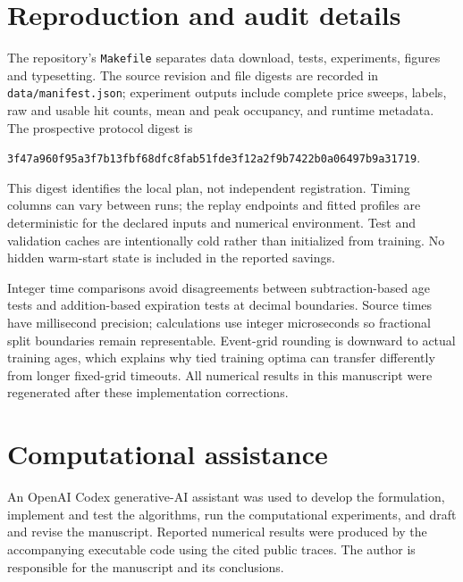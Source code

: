 \documentclass[11pt,a4paper]{article}
\begin{document}
\clearpage
\section{Reproduction and audit details}
The repository's \texttt{Makefile} separates data download, tests, experiments,
figures and typesetting. The source revision and file digests are recorded in
\texttt{data/manifest.json}; experiment outputs include complete price sweeps,
labels, raw and usable hit counts, mean and peak occupancy, and runtime metadata.
The prospective protocol digest is
\begin{center}\footnotesize\texttt{3f47a960f95a3f7b13fbf68dfc8fab51fde3f12a2f9b7422b0a06497b9a31719}.\end{center}
This digest identifies the local plan, not independent registration. Timing
columns can vary between runs; the replay endpoints and fitted profiles are
deterministic for the declared inputs and numerical environment. Test and
validation caches are intentionally cold rather than initialized from training.
No hidden warm-start state is included in the reported savings.

Integer time comparisons avoid disagreements between subtraction-based age
tests and addition-based expiration tests at decimal boundaries. Source times
have millisecond precision; calculations use integer microseconds so fractional
split boundaries remain representable. Event-grid rounding is downward to actual
training ages, which explains why tied training optima can transfer differently
from longer fixed-grid timeouts. All numerical results in this manuscript were
regenerated after these implementation corrections.

\section*{Computational assistance}
An OpenAI Codex generative-AI assistant was used to develop the formulation,
implement and test the algorithms, run the computational experiments, and draft
and revise the manuscript. Reported numerical results were produced by the
accompanying executable code using the cited public traces. The author is
responsible for the manuscript and its conclusions.
\end{document}
